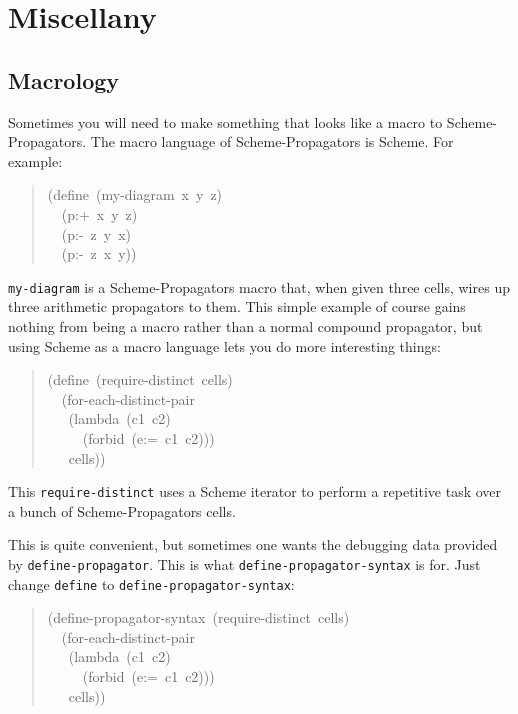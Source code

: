 \documentclass[12pt,letterpaper,english]{article}
\begin{document}

\hypertarget{miscellany}{}
\section{Miscellany}
\label{miscellany}



\hypertarget{macrology}{}
\subsection{Macrology}
\label{macrology}

Sometimes you will need to make something that looks like a macro to
Scheme-Propagators.  The macro language of Scheme-Propagators is
Scheme.  For example:
\begin{quote}{\ttfamily \raggedright \noindent
(define~(my-diagram~x~y~z)~\\
~~(p:+~x~y~z)~\\
~~(p:-~z~y~x)~\\
~~(p:-~z~x~y))
}\end{quote}

\texttt{my-diagram} is a Scheme-Propagators macro that, when given three
cells, wires up three arithmetic propagators to them.  This simple
example of course gains nothing from being a macro rather
than a normal compound propagator, but using Scheme as a macro
language lets you do more interesting things:
\begin{quote}{\ttfamily \raggedright \noindent
(define~(require-distinct~cells)~\\
~~(for-each-distinct-pair~\\
~~~(lambda~(c1~c2)~\\
~~~~~(forbid~(e:=~c1~c2)))~\\
~~~cells))
}\end{quote}

This \texttt{require-distinct} uses a Scheme iterator to perform a
repetitive task over a bunch of Scheme-Propagators cells.

This is quite convenient, but sometimes one wants the debugging data
provided by \texttt{define-propagator}.  This is what
\texttt{define-propagator-syntax} is for.  Just change \texttt{define} to
\texttt{define-propagator-syntax}:
\begin{quote}{\ttfamily \raggedright \noindent
(define-propagator-syntax~(require-distinct~cells)~\\
~~(for-each-distinct-pair~\\
~~~(lambda~(c1~c2)~\\
~~~~~(forbid~(e:=~c1~c2)))~\\
~~~cells))
}\end{quote}
\end{document}
